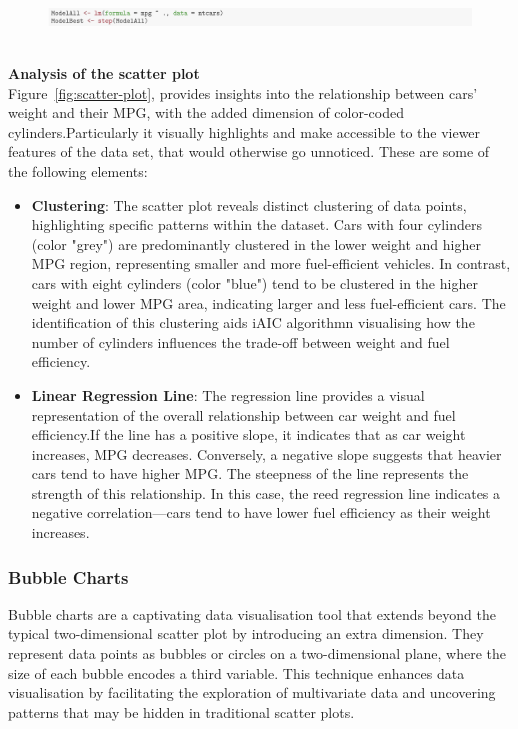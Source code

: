 \documentclass{article}\usepackage[]{graphicx}\usepackage[]{xcolor}
\begin{document}
\begin{figure}[H]
    \centering
    \includegraphics[width=1\textwidth]{codeshoot.png}
    \label{fig:codeshoot}
\end{figure}
\\ 
\textbf{Analysis of the scatter plot}\\
Figure~\ref{fig:scatter-plot}, provides insights into the relationship between cars' weight and their MPG, with the added dimension of color-coded cylinders.Particularly it visually highlights and make accessible to the viewer features of the data set, that would otherwise go unnoticed. These are some of the following elements: 
\begin{itemize}
    \item \textbf{Clustering}: The scatter plot reveals distinct clustering of data points, highlighting specific patterns within the dataset. Cars with four cylinders (color "grey") are predominantly clustered in the lower weight and higher MPG region, representing smaller and more fuel-efficient vehicles. In contrast, cars with eight cylinders (color "blue") tend to be clustered in the higher weight and lower MPG area, indicating larger and less fuel-efficient cars. The identification of this clustering aids iAIC algorithmn visualising how the number of cylinders influences the trade-off between weight and fuel efficiency.\\
    \item \textbf{Linear Regression Line}: The regression line provides a visual representation of the overall relationship between car weight and fuel efficiency.If the line has a positive slope, it indicates that as car weight increases, MPG decreases. Conversely, a negative slope suggests that heavier cars tend to have higher MPG. The steepness of the line represents the strength of this relationship. In this case, the reed regression line indicates a negative correlation—cars tend to have lower fuel efficiency as their weight increases.
\end{itemize}

\subsubsection{Bubble Charts}
Bubble charts are a captivating data visualisation tool that extends beyond the typical two-dimensional scatter plot by introducing an extra dimension. They represent data points as bubbles or circles on a two-dimensional plane, where the size of each bubble encodes a third variable. This technique enhances data visualisation by facilitating the exploration of multivariate data and uncovering patterns that may be hidden in traditional scatter plots.\\
\end{document}
